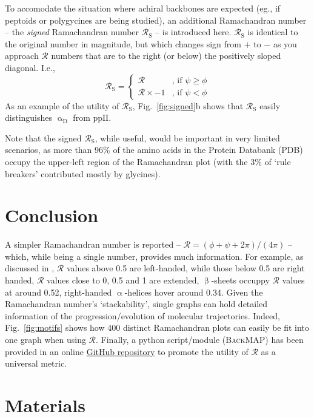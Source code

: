 \documentclass[fleqn,10pt,lineno]{wlpeerj} %
\newcommand{\Fig}[1]{Fig.~\ref{#1}}
\newcommand{\n}[1]{{\color{red}#1}}
\newcommand{\gname}{BackMAP}
\newcommand{\pname}{\textsc{\gname}\xspace}
\newcommand{\rr}{$\mathcal{R}$\xspace}
\begin{document}
To accomodate the situation where achiral backbones are expected (eg., if peptoids or polygycines are being studied), an additional Ramachandran number -- the \textit{signed} Ramachandran number $\mathcal{R}_\textrm{S}$ -- is introduced here. $\mathcal{R}_\textrm{S}$ is identical to the original number in magnitude, but which changes sign from $+$ to $-$ as you approach $\mathcal{R}$ numbers that are to the right (or below) the positively sloped diagonal. I.e., 
\begin{equation}
\mathcal{R}_\textrm{S} = 
\begin{cases}
    \mathcal{R}         &\text{, if } \psi \geq \phi  \\
    \mathcal{R}\times-1 &\text{, if } \psi   <  \phi
\end{cases}\label{eqn:signed}
\end{equation}
As an example of the utility of $\mathcal{R}_\textrm{S}$, \Fig{fig:signed}b shows that $\mathcal{R}_\textrm{S}$ easily distinguishes $\upalpha_\textrm{D}$ from $\textrm{ppII}$.

Note that the signed $\mathcal{R}_\textrm{S}$, while useful, would be important in very limited scenarios, as more than 96\% of the amino acids in the Protein Databank (PDB) occupy the upper-left region of the Ramachandran plot (with the 3\% of `rule breakers' contributed mostly by glycines).

\section*{Conclusion}

A simpler Ramachandran number is reported -- $\mathcal{R} = (\phi+\psi+2\pi)/(4\pi)$ -- which, while being a single number, provides much information. For example, as discussed in \cite{Mannige2016}, \rr values above 0.5 are left-handed, while those below 0.5 are right handed, \rr values close to 0, 0.5 and 1 are extended, $\upbeta$-sheets occuppy \rr values at around 0.52, right-handed $\upalpha$-helices hover around 0.34. Given the Ramachandran number's `stackability', single graphs can hold detailed information of the progression/evolution of molecular trajectories. Indeed, \Fig{fig:motifs} shows how 400 distinct Ramachandran plots can easily be fit into one graph when using \rr. Finally, a python script/module (\pname) has been \n{provided} in an online \href{https://github.com/ranjanmannige/\gname}{GitHub repository} to promote the utility of \rr as a universal metric.

\section*{Materials}
\end{document}
